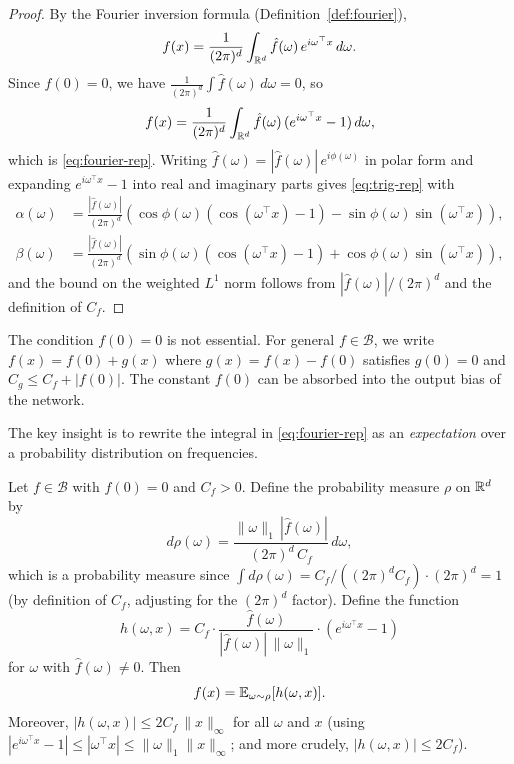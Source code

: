 \documentclass[11pt,a4paper]{article}
\begin{document}
\begin{proof}
By the Fourier inversion formula (Definition~\ref{def:fourier}),
\[
  f(x) = \frac{1}{(2\pi)^d} \int_{\mathbb{R}^d} \hat{f}(\omega) \,
  e^{i\omega^\top x} \, d\omega.
\]
Since $f(0) = 0$, we have $\frac{1}{(2\pi)^d} \int \hat{f}(\omega) \,
d\omega = 0$, so
\[
  f(x) = \frac{1}{(2\pi)^d} \int_{\mathbb{R}^d} \hat{f}(\omega) \,
  (e^{i\omega^\top x} - 1) \, d\omega,
\]
which is \eqref{eq:fourier-rep}.  Writing $\hat{f}(\omega) = |\hat{f}
(\omega)| \, e^{i\phi(\omega)}$ in polar form and expanding $e^{i
\omega^\top x} - 1$ into real and imaginary parts gives
\eqref{eq:trig-rep} with
\begin{align*}
  \alpha(\omega) &= \frac{|\hat{f}(\omega)|}{(2\pi)^d}
    (\cos\phi(\omega)(\cos(\omega^\top x) - 1)
    - \sin\phi(\omega)\sin(\omega^\top x)), \\
  \beta(\omega) &= \frac{|\hat{f}(\omega)|}{(2\pi)^d}
    (\sin\phi(\omega)(\cos(\omega^\top x) - 1)
    + \cos\phi(\omega)\sin(\omega^\top x)),
\end{align*}
and the bound on the weighted $L^1$ norm follows from
$|\hat{f}(\omega)| / (2\pi)^d$ and the definition of $C_f$.
\end{proof}

\begin{remark}
\label{rem:centering}
The condition $f(0) = 0$ is not essential.  For general $f \in \mathcal{B}$,
we write $f(x) = f(0) + g(x)$ where $g(x) = f(x) - f(0)$ satisfies
$g(0) = 0$ and $C_g \le C_f + |f(0)|$.  The constant $f(0)$ can be
absorbed into the output bias of the network.
\end{remark}

The key insight is to rewrite the integral in \eqref{eq:fourier-rep} as
an \emph{expectation} over a probability distribution on frequencies.

\begin{proposition}
\label{prop:expectation-rep}
Let $f \in \mathcal{B}$ with $f(0) = 0$ and $C_f > 0$.  Define the
probability measure $\rho$ on $\mathbb{R}^d$ by
\[
  d\rho(\omega) = \frac{\|\omega\|_1 \, |\hat{f}(\omega)|}{(2\pi)^d \,
  C_f} \, d\omega,
\]
which is a probability measure since $\int d\rho(\omega) = C_f /
((2\pi)^d C_f) \cdot (2\pi)^d = 1$ (by definition of $C_f$, adjusting
for the $(2\pi)^d$ factor).  Define the function
\[
  h(\omega, x)
  = C_f \cdot \frac{\hat{f}(\omega)}{|\hat{f}(\omega)| \, \|\omega\|_1}
  \cdot (e^{i\omega^\top x} - 1)
\]
for $\omega$ with $\hat{f}(\omega) \neq 0$.  Then
\begin{equation}
\label{eq:expectation-rep}
  f(x) = \mathbb{E}_{\omega \sim \rho}[h(\omega, x)].
\end{equation}
Moreover, $|h(\omega, x)| \le 2 C_f \, \|x\|_\infty$ for all $\omega$
and $x$ (using $|e^{i\omega^\top x} - 1| \le |\omega^\top x| \le
\|\omega\|_1 \|x\|_\infty$; and more crudely, $|h(\omega,x)| \le 2C_f$).
\end{proposition}
\end{document}
